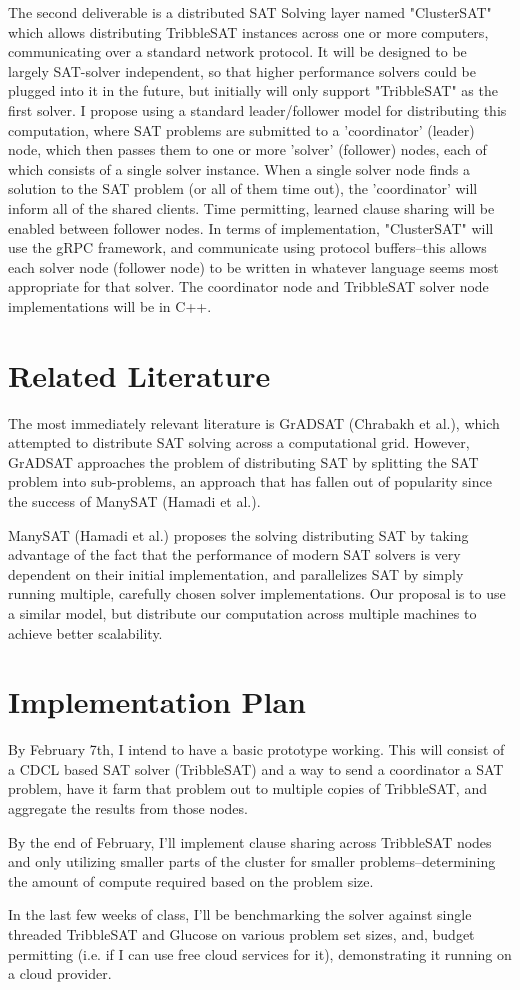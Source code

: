 \documentclass[10pt]{article}
\begin{document}
  The second deliverable is a distributed SAT Solving layer named "ClusterSAT" which allows distributing
  TribbleSAT instances across one or more computers, communicating over a standard network protocol.  It will
  be designed to be largely SAT-solver independent, so that higher performance solvers could be 
  plugged into it in the future, but initially will only support "TribbleSAT" as the first solver.
  I propose using a standard leader/follower model for distributing this computation, 
  where SAT problems are submitted to a 'coordinator' (leader) node, which then passes them to one or more 
  'solver' (follower) nodes, each of which consists of a single solver instance.  When a single solver node finds
  a solution to the SAT problem (or all of them time out), the 'coordinator' will inform all of the shared clients.
  Time permitting, learned clause sharing will be enabled between follower nodes. In terms of implementation, 
  "ClusterSAT" will use the gRPC framework, and communicate using protocol buffers--this allows each solver node 
  (follower node) to be written in whatever language seems most appropriate for that solver.  The coordinator node 
  and TribbleSAT solver node implementations will be in C++.

\section{Related Literature}
  The most immediately relevant literature is GrADSAT (Chrabakh et al.), which attempted to distribute SAT solving
  across a computational grid.  However, GrADSAT approaches the problem of distributing SAT by splitting the SAT problem
  into sub-problems, an approach that has fallen out of popularity since the success of ManySAT (Hamadi et al.).

  ManySAT (Hamadi et al.) proposes the solving distributing SAT by taking advantage of the fact that the performance of
  modern SAT solvers is very dependent on their initial implementation, and parallelizes SAT by simply running multiple,
  carefully chosen solver implementations.  Our proposal is to use a similar model, but distribute our computation across
  multiple machines to achieve better scalability.

\section{Implementation Plan}
  By February 7th, I intend to have a basic prototype working.  This will consist of a CDCL based SAT solver (TribbleSAT) 
  and a way to send a coordinator a SAT problem, have it farm that problem out to multiple copies of TribbleSAT, and 
  aggregate the results from those nodes.

  By the end of February, I'll implement clause sharing across TribbleSAT nodes and only utilizing smaller parts of the 
  cluster for smaller problems--determining the amount of compute required based on the problem size.

  In the last few weeks of class, I'll be benchmarking the solver against single threaded TribbleSAT and Glucose on various
  problem set sizes, and, budget permitting (i.e. if I can use free cloud services for it), demonstrating it running on a
  cloud provider.
\end{document}
